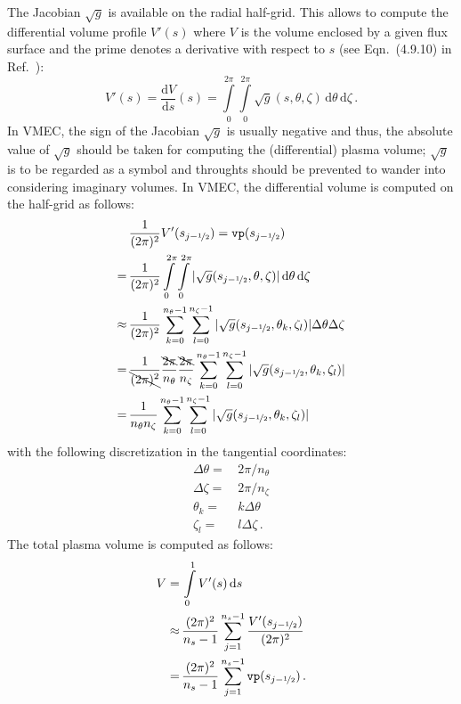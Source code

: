 The Jacobian $\sqrt{g}$ is available on the radial half-grid.
This allows to compute the differential volume profile $V'(s)$
where $V$ is the volume enclosed by a given flux surface and the prime denotes a derivative with respect to $s$ (see Eqn.~(4.9.10) in Ref.~\cite{dHaseleer}):
\begin{equation}
  V'(s) = \frac{\mathrm{d}V}{\mathrm{d}s}(s) = \int\limits_0^{2 \pi} \int\limits_0^{2 \pi} \sqrt{g}(s, \theta, \zeta) \,\mathrm{d}\theta \,\mathrm{d}\zeta \, .
\end{equation}
In VMEC, the sign of the Jacobian $\sqrt{g}$ is usually negative and thus, the absolute value of $\sqrt{g}$ should be taken
for computing the (differential) plasma volume; $\sqrt{g}$ is to be regarded as a symbol and throughts should be prevented to wander into considering imaginary volumes.
In VMEC, the differential volume is computed on the half-grid as follows:
\begin{align}
        ~&\, \frac{1}{(2 \pi)^2} V'(s_{j-\nicefrac{1}{2}}) = \texttt{vp}(s_{j-\nicefrac{1}{2}}) \nonumber \\
        =&\, \frac{1}{(2 \pi)^2}\int\limits_0^{2 \pi} \int\limits_0^{2 \pi} |\sqrt{g}(s_{j-\nicefrac{1}{2}}, \theta, \zeta)| \,\mathrm{d}\theta \,\mathrm{d}\zeta \nonumber \\
  \approx&\, \frac{1}{(2 \pi)^2}\sum\limits_{k=0}^{n_\theta - 1} \sum\limits_{l=0}^{n_\zeta - 1} |\sqrt{g}(s_{j-\nicefrac{1}{2}}, \theta_k, \zeta_l)| \Delta \theta \Delta \zeta \nonumber \\
        =&\, \frac{1}{\bcancel{(2 \pi)^2}} \frac{\bcancel{2 \pi}}{n_\theta} \frac{\bcancel{2 \pi}}{n_\zeta}
               \sum\limits_{k=0}^{n_\theta - 1} \sum\limits_{l=0}^{n_\zeta - 1} |\sqrt{g}(s_{j-\nicefrac{1}{2}}, \theta_k, \zeta_l)| \nonumber \\
        =&\, \frac{1}{n_\theta n_\zeta} \sum\limits_{k=0}^{n_\theta - 1} \sum\limits_{l=0}^{n_\zeta - 1} |\sqrt{g}(s_{j-\nicefrac{1}{2}}, \theta_k, \zeta_l)|
\end{align}
with the following discretization in the tangential coordinates:
\begin{align}
  \Delta \theta =&\, 2 \pi / n_\theta \\
  \Delta \zeta  =&\, 2 \pi / n_\zeta  \\
  \theta_k      =&\, k \Delta \theta \\
  \zeta_l       =&\, l \Delta \zeta \, .
\end{align}
The total plasma volume is computed as follows:
\begin{align}
  V       =&\, \int\limits_0^1 V'(s) \,\mathrm{d}s \\
    \approx&\, \frac{(2 \pi)^2}{n_s-1} \sum\limits_{j=1}^{n_s - 1} \frac{V'(s_{j-\nicefrac{1}{2}})}{(2 \pi)^2} \\
          =&\, \frac{(2 \pi)^2}{n_s-1} \sum\limits_{j=1}^{n_s - 1} \texttt{vp}(s_{j-\nicefrac{1}{2}}) \, . \label{eqn:voli}
\end{align}
